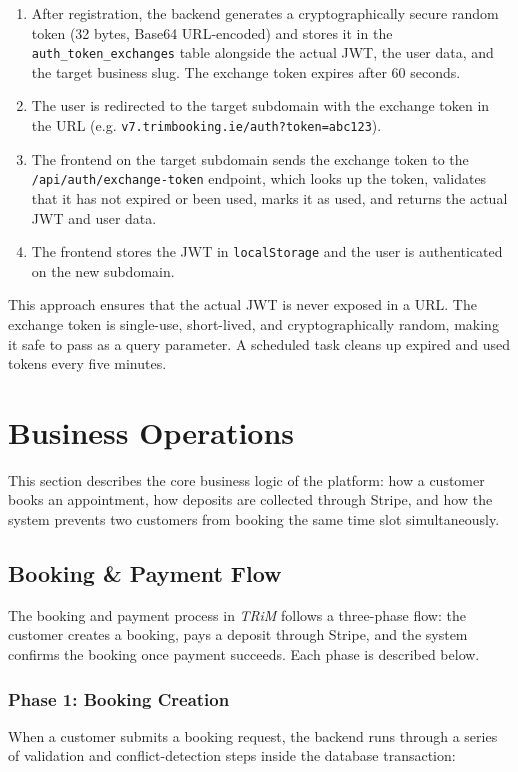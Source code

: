 \begin{enumerate}
    \item After registration, the backend generates a cryptographically secure random token (32 bytes, Base64 URL-encoded) and stores it in the \texttt{auth\_token\_\allowbreak exchanges} table alongside the actual JWT, the user data, and the target business slug. The exchange token expires after 60 seconds.
    \item The user is redirected to the target subdomain with the exchange token in the URL (e.g. \texttt{v7.trimbooking.ie/auth?token=abc123}).
    \item The frontend on the target subdomain sends the exchange token to the \texttt{/api/auth/exchange-token} endpoint, which looks up the token, validates that it has not expired or been used, marks it as used, and returns the actual JWT and user data.
    \item The frontend stores the JWT in \texttt{localStorage} and the user is authenticated on the new subdomain.
\end{enumerate}

This approach ensures that the actual JWT is never exposed in a URL. The exchange token is single-use, short-lived, and cryptographically random, making it safe to pass as a query parameter. A scheduled task cleans up expired and used tokens every five minutes.

\section{Business Operations}
This section describes the core business logic of the platform: how a customer books an appointment, how deposits are collected through Stripe, and how the system prevents two customers from booking the same time slot simultaneously.

\subsection*{Booking \& Payment Flow}
The booking and payment process in \textit{TRiM} follows a three-phase flow: the customer creates a booking, pays a deposit through Stripe, and the system confirms the booking once payment succeeds. Each phase is described below.

\subsubsection*{Phase 1: Booking Creation}
When a customer submits a booking request, the backend runs through a series of validation and conflict-detection steps inside the database transaction:

